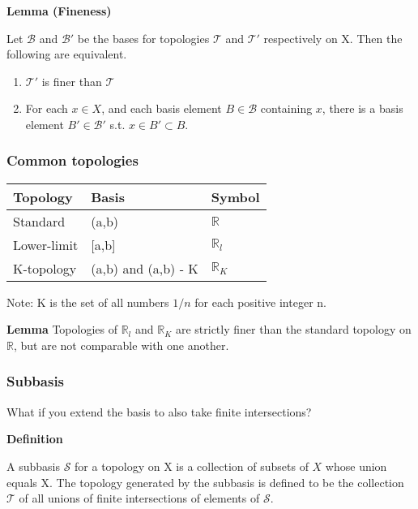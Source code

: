 \documentclass[11pt]{article}
\begin{document}
\textbf{Lemma (Fineness)}

Let \(\mathcal{B}\) and \(\mathcal{B}'\) be the bases for topologies \(\mathcal{T}\) and \(\mathcal{T}'\) respectively on X. Then the following are equivalent.

\begin{enumerate}
\item \(\mathcal{T}'\) is finer than \(\mathcal{T}\)
\item For each \(x \in X\), and each basis element \(B \in \mathcal{B}\) containing \(x\), there is a basis element \(B' \in \mathcal{B}'\) s.t. \(x \in B' \subset B\).
\end{enumerate}


\subsubsection{Common topologies}
\label{sec:orgb13d1f5}

\begin{center}
\begin{tabular}{lll}
Topology & Basis & Symbol\\
\hline
Standard & (a,b) & \(\mathbb{R}\)\\
Lower-limit & [a,b] & \(\mathbb{R}_l\)\\
K-topology & (a,b) and (a,b) - K & \(\mathbb{R}_K\)\\
\end{tabular}
\end{center}

Note: K is the set of all numbers \(1/n\) for each positive integer n.

\textbf{Lemma}
Topologies of \(\mathbb{R}_l\) and \(\mathbb{R}_K\) are strictly finer than the standard topology on \(\mathbb{R}\), but are not comparable with one another.

\subsubsection{Subbasis}
\label{sec:org0ea1991}

What if you extend the basis to also take finite intersections?

\textbf{Definition}

A subbasis \(\mathcal{S}\) for a topology on X is a collection of subsets of \(X\) whose union equals X. The topology generated by the subbasis is defined to be the collection \(\mathcal{T}\) of all unions of finite intersections of elements of \(\mathcal{S}\).
\end{document}
